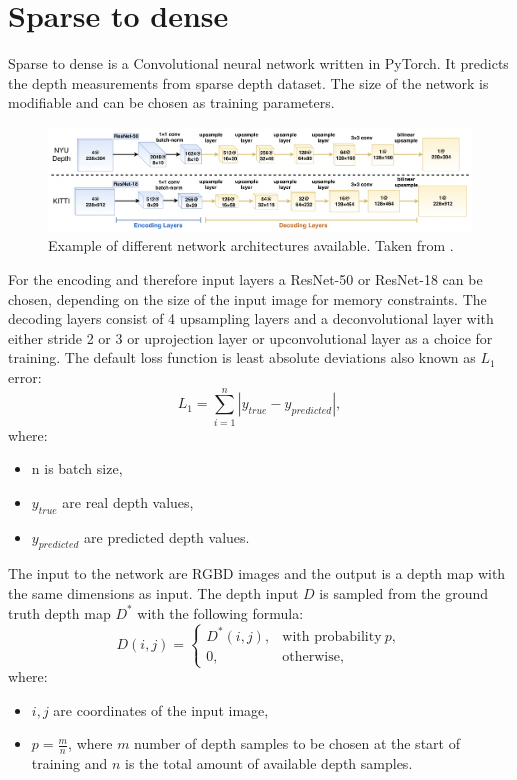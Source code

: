 \documentclass[twoside]{ctuthesis}
\theoremstyle{plain}
\theoremstyle{definition}
\theoremstyle{note}
\begin{document}
\section{Sparse to dense} \label{s2d}
Sparse to dense is a Convolutional neural network written in PyTorch. \cite{ma2018sparsetodense} It predicts the depth measurements from sparse depth dataset. The size of the network is modifiable and can be chosen as training parameters.
\begin{figure}[h]
	\caption{Example of different network architectures available. Taken from \cite{ma2018sparsetodense}.}
	\includegraphics[width=\textwidth]{sparse2dense.png}
	\centering
\end{figure}
For the encoding and therefore input layers a ResNet-50 or ResNet-18 can be chosen, depending on the size of the input image for memory constraints. The decoding layers consist of 4 upsampling layers and a deconvolutional layer with either stride 2 or 3 or uprojection layer or upconvolutional layer as a choice for training. The default loss function is least absolute deviations also known as $L_1$ error:
\begin{equation}
	L_1=\sum_{i=1}^{n}|y_{true}-y_{predicted}|,
\end{equation}
where:
\begin{itemize}
	\item n is batch size,
	\item $y_{true}$ are real depth values,
	\item $y_{predicted}$ are predicted depth values.
\end{itemize}
The input to the network are RGBD images and the output is a depth map with the same dimensions as input. The depth input $D$ is sampled from the ground truth depth map $D^*$ with the following formula:
\begin{equation}
	D(i,j)=\begin{cases}
		D^*(i,j),&\text{with probability}\ p,\\
		0,&\text{otherwise},
	\end{cases}
\end{equation}
where:
\begin{itemize}
	\item $i,j$ are coordinates of the input image,
	\item $p=\frac{m}{n}$, where $m$ number of depth samples to be chosen at the start of training and $n$ is the total amount of available depth samples.
\end{itemize}
\end{document}

